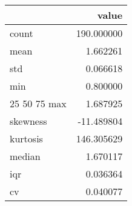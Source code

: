 \begin{tabular}{lr}
\toprule
 & value \\
\midrule
count & 190.000000 \\
mean & 1.662261 \\
std & 0.066618 \\
min & 0.800000 \\
25%
50%
75%
max & 1.687925 \\
skewness & -11.489804 \\
kurtosis & 146.305629 \\
median & 1.670117 \\
iqr & 0.036364 \\
cv & 0.040077 \\
\bottomrule
\end{tabular}

